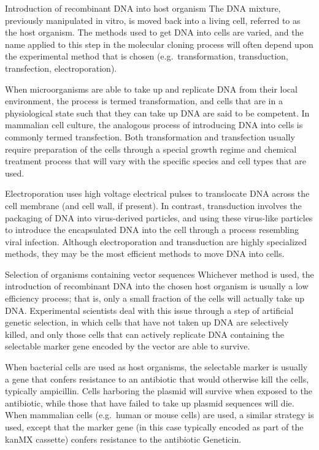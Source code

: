 Introduction of recombinant DNA into host organism
The DNA mixture, previously manipulated in vitro, is moved back into a living cell, referred to as the host organism. The methods used to get DNA into cells are varied, and the name applied to this step in the molecular cloning process will often depend upon the experimental method that is chosen (e.g.~transformation, transduction, transfection, electroporation).

When microorganisms are able to take up and replicate DNA from their local environment, the process is termed transformation, and cells that are in a physiological state such that they can take up DNA are said to be competent. In mammalian cell culture, the analogous process of introducing DNA into cells is commonly termed transfection. Both transformation and transfection usually require preparation of the cells through a special growth regime and chemical treatment process that will vary with the specific species and cell types that are used.

Electroporation uses high voltage electrical pulses to translocate DNA across the cell membrane (and cell wall, if present). In contrast, transduction involves the packaging of DNA into virus-derived particles, and using these virus-like particles to introduce the encapsulated DNA into the cell through a process resembling viral infection. Although electroporation and transduction are highly specialized methods, they may be the most efficient methods to move DNA into cells.

Selection of organisms containing vector sequences
Whichever method is used, the introduction of recombinant DNA into the chosen host organism is usually a low efficiency process; that is, only a small fraction of the cells will actually take up DNA. Experimental scientists deal with this issue through a step of artificial genetic selection, in which cells that have not taken up DNA are selectively killed, and only those cells that can actively replicate DNA containing the selectable marker gene encoded by the vector are able to survive.

When bacterial cells are used as host organisms, the selectable marker is usually a gene that confers resistance to an antibiotic that would otherwise kill the cells, typically ampicillin. Cells harboring the plasmid will survive when exposed to the antibiotic, while those that have failed to take up plasmid sequences will die. When mammalian cells (e.g.~human or mouse cells) are used, a similar strategy is used, except that the marker gene (in this case typically encoded as part of the kanMX cassette) confers resistance to the antibiotic Geneticin.


